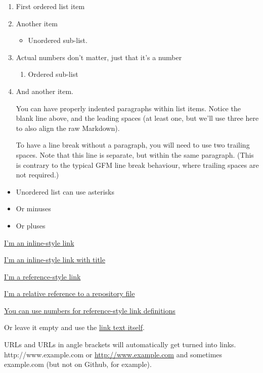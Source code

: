 \documentclass[
]{article}
\providecommand{\tightlist}{%
  \setlength{\itemsep}{0pt}\setlength{\parskip}{0pt}}
\begin{document}
\begin{enumerate}
\def\labelenumi{\arabic{enumi}.}
\item
  First ordered list item
\item
  Another item

  \begin{itemize}
  \tightlist
  \item
    Unordered sub-list.
  \end{itemize}
\item
  Actual numbers don't matter, just that it's a number

  \begin{enumerate}
  \def\labelenumii{\arabic{enumii}.}
  \tightlist
  \item
    Ordered sub-list
  \end{enumerate}
\item
  And another item.

  You can have properly indented paragraphs within list items. Notice
  the blank line above, and the leading spaces (at least one, but we'll
  use three here to also align the raw Markdown).

  To have a line break without a paragraph, you will need to use two
  trailing spaces. Note that this line is separate, but within the same
  paragraph. (This is contrary to the typical GFM line break behaviour,
  where trailing spaces are not required.)
\end{enumerate}

\begin{itemize}
\tightlist
\item
  Unordered list can use asterisks
\item
  Or minuses
\item
  Or pluses
\end{itemize}

\href{https://www.google.com}{I'm an inline-style link}

\href{https://www.google.com}{I'm an inline-style link with title}

\href{https://www.mozilla.org}{I'm a reference-style link}

\href{../blob/master/LICENSE}{I'm a relative reference to a repository
file}

\href{http://slashdot.org}{You can use numbers for reference-style link
definitions}

Or leave it empty and use the \href{http://www.reddit.com}{link text
itself}.

URLs and URLs in angle brackets will automatically get turned into
links. http://www.example.com or \url{http://www.example.com} and
sometimes example.com (but not on Github, for example).
\end{document}
